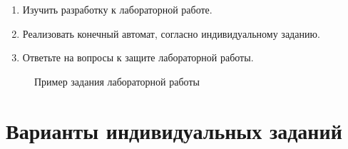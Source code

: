 \begin{enumerate}%
\item{Изучить разработку к лабораторной работе.}
\item{Реализовать конечный автомат, согласно индивидуальному заданию.}
\item{Ответьте на вопросы к защите лабораторной работы.}
\end{enumerate}


\begin{figure}[H]
  \centering
  \def\svgwidth{6cm}
  
  \caption{Пример задания лабораторной работы}
\end{figure}


\clearpage
\section{Варианты индивидуальных заданий}



